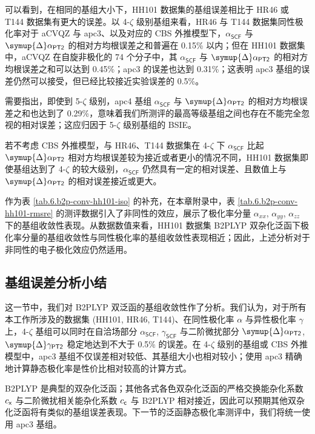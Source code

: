 可以看到，在相同的基组大小下，HH101 数据集的基组误差相比于 HR46 或 T144 数据集有更大的误差。以 4-$\zeta$ 级别基组来看，HR46 与 T144 数据集同性极化率对于 aCVQZ 与 apc3、以及对应的 CBS 外推模型下，$\alpha_\textsf{SCF}$ 与 $\symup{\Delta} \alpha_\textsf{PT2}$ 的相对方均根误差之和普遍在 0.15\% 以内；但在 HH101 数据集中，aCVQZ 在自旋非极化的 74 个分子中，其 $\alpha_\textsf{SCF}$ 与 $\symup{\Delta} \alpha_\textsf{PT2}$ 的相对方均根误差之和可以达到 0.45\%；apc3 的误差也达到 0.31\%；这表明 apc3 基组的误差仍然可以接受，但已经比较接近实验误差的 0.5\%。

需要指出，即使到 5-$\zeta$ 级别，apc4 基组 $\alpha_\textsf{SCF}$ 与 $\symup{\Delta} \alpha_\textsf{PT2}$ 的相对方均根误差之和也达到了 0.29\%，意味着我们所测评的最高等级基组之间也存在不能完全忽视的相对误差；这应归因于 5-$\zeta$ 级别基组的 BSIE。

若不考虑 CBS 外推模型，与 HR46、T144 数据集在 4-$\zeta$ 下 $\alpha_\textsf{SCF}$ 比起 $\symup{\Delta} \alpha_\textsf{PT2}$ 相对方均根误差较为接近或者更小的情况不同，HH101 数据集即使基组达到了 4-$\zeta$ 的较大级别，$\alpha_\textsf{SCF}$ 仍然具有一定的相对误差、且数值上与 $\symup{\Delta} \alpha_\textsf{PT2}$ 的相对误差接近或更大。

作为表 \ref{tab.6.b2p-conv-hh101-iso} 的补充，在本章附录中，表 \ref{tab.6.b2p-conv-hh101-rmsre} 的测评数据引入了非同性的效应，展示了极化率分量 $\alpha_{xx}$, $\alpha_{yy}$, $\alpha_{zz}$ 下的基组收敛性表现。从数据数值来看，HH101 数据集 B2PLYP 双杂化泛函下极化率分量的基组收敛性与同性极化率的基组收敛性表现相近；因此，上述分析对于非同性的电子极化效应仍然适用。

\subsection{基组误差分析小结}

这一节中，我们对 B2PLYP 双泛函的基组收敛性作了分析。我们认为，对于所有本工作所涉及的数据集 (HH101, HR46, T144)、在同性极化率 $\alpha$ 与异性极化率 $\gamma$ 上，4-$\zeta$ 基组可以同时在自洽场部分 $\alpha_\textsf{SCF}$, $\gamma_\textsf{SCF}$ 与二阶微扰部分 $\symup{\Delta} \alpha_\textsf{PT2}$, $\symup{\Delta} \gamma_\textsf{PT2}$ 稳定地达到不大于 0.5\% 的误差。在 4-$\zeta$ 级别的基组或 CBS 外推模型中，apc3 基组不仅误差相对较低、其基组大小也相对较小；使用 apc3 精确地计算静态极化率是性价比相对较高的计算方式。

B2PLYP 是典型的双杂化泛函；其他各式各色双杂化泛函的严格交换能杂化系数 $c_{\textsf{x}}$ 与二阶微扰相关能杂化系数 $c_{\textsf{c}}$ 与 B2PLYP 相对接近，因此可以预期其他双杂化泛函将有类似的基组误差表现。下一节的泛函静态极化率测评中，我们将统一使用 apc3 基组。

